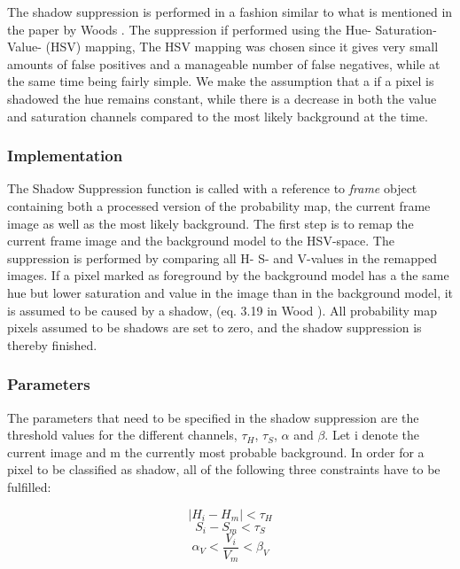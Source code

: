 The shadow suppression is performed in a fashion similar to what is mentioned in the paper by Woods \cite{Wood}. The suppression if performed using the Hue- Saturation- Value- (HSV) mapping, The HSV mapping was chosen since it gives very small amounts of false positives and a manageable number of false negatives, while at the same time being fairly simple. We make the assumption that a if a pixel is shadowed the hue remains constant, while there is a decrease in both the value and saturation channels compared to the most likely background at the time.


\subsubsection{Implementation}
The Shadow Suppression function is called with a reference to \emph{frame} object containing both a processed version of the probability map, the current frame image as well as the most likely background. The first step is to remap the current frame image and the background model to the HSV-space. The suppression is performed by comparing all H- S- and V-values in the remapped images. If a pixel marked as foreground by the background model has a the same hue but lower saturation and value in the image than in the background model, it is assumed to be caused by a shadow, (eq. 3.19 in Wood \cite{Wood}). All probability map pixels assumed to be shadows are set to zero, and the shadow suppression is thereby finished.

\subsubsection{Parameters}
The parameters that need to be specified in the shadow suppression are the threshold values for the different channels, $\tau_H$, $\tau_S$, $\alpha$ and $\beta$. Let i denote the current image and m the currently most probable background. In order for a pixel to be classified as shadow, all of the following three constraints have to be fulfilled:

\begin{equation}
	|H_i - H_m| < \tau_H
	\label{eq:H}
\end{equation}
\begin{equation}
	S_i - S_m < \tau_S
	\label{eq:S}
\end{equation}
\begin{equation}
	\alpha_V < \frac{V_i}{V_m} < \beta_V
	\label{eq:V}
\end{equation}

